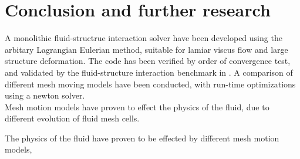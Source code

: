\chapter{Conclusion and further research}
A monolithic fluid-structrue interaction solver have been developed using the arbitary Lagrangian Eulerian method, suitable for lamiar viscus flow and large structure deformation. The code has been verified by order of convergence test, and validated by the fluid-structure interaction benchmark in \cite{Hron2006}. A comparison of different mesh moving models have been conducted, with run-time optimizations using a newton solver. \\

Mesh motion models have proven to effect the physics of the fluid, due to different evolution of fluid mesh cells.


The physics of the fluid have proven to be effected by different mesh motion models, 